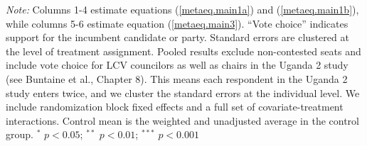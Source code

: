 \begin{table}[!htbp]
\begin{flushleft}\textit{Note:}  Columns 1-4 estimate equations (\ref{metaeq.main1a}) and (\ref{metaeq.main1b}), while columns 5-6 estimate equation (\ref{metaeq.main3}).  ``Vote choice'' indicates support for the incumbent candidate or party. Standard errors are clustered at the level of treatment assignment. Pooled results exclude non-contested seats and include vote choice for LCV councilors as well as chairs in the Uganda 2 study (see Buntaine et al., Chapter 8). This means each respondent in the Uganda 2 study enters twice, and we cluster the standard errors at the individual level. We include randomization block fixed effects and a full set of covariate-treatment interactions. Control mean is the weighted and unadjusted average in the control group. $^*$ $p<0.05$; $^{**}$ $p<0.01$; $^{***}$ $p<0.001$ \end{flushleft}
\end{table} 
